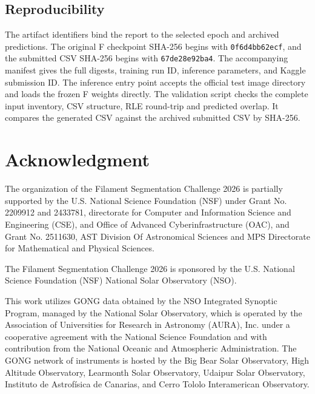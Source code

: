 \documentclass[sigconf]{acmart}
\begin{document}
\subsection{Reproducibility}
The artifact identifiers bind the report to the selected epoch and archived predictions. The original F checkpoint SHA-256 begins with \texttt{0f6d4bb62ecf}, and the submitted CSV SHA-256 begins with \texttt{67de28e92ba4}. The accompanying manifest gives the full digests, training run ID, inference parameters, and Kaggle submission ID. The inference entry point accepts the official test image directory and loads the frozen F weights directly. The validation script checks the complete input inventory, CSV structure, RLE round-trip and predicted overlap. It compares the generated CSV against the archived submitted CSV by SHA-256.

\newpage
\section{Acknowledgment}\label{sec:acknowledgment}
The organization of the Filament Segmentation Challenge 2026 is partially supported by the U.S. National Science Foundation (NSF) under Grant No. 2209912 and 2433781, directorate for Computer and Information Science and Engineering (CSE), and Office of Advanced Cyberinfrastructure (OAC), and Grant No. 2511630, AST Division Of Astronomical Sciences and MPS Directorate for Mathematical and Physical Sciences.

The Filament Segmentation Challenge 2026 is sponsored by the U.S. National Science Foundation (NSF) National Solar Observatory (NSO).

This work utilizes GONG data obtained by the NSO Integrated Synoptic Program, managed by the National Solar Observatory, which is operated by the Association of Universities for Research in Astronomy (AURA), Inc. under a cooperative agreement with the National Science Foundation and with contribution from the National Oceanic and Atmospheric Administration. The GONG network of instruments is hosted by the Big Bear Solar Observatory, High Altitude Observatory, Learmonth Solar Observatory, Udaipur Solar Observatory, Instituto de Astrofísica de Canarias, and Cerro Tololo Interamerican Observatory.



\end{document}
